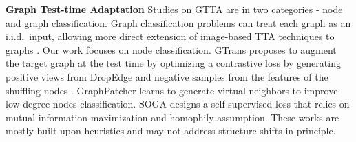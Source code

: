 \textbf{Graph Test-time Adaptation} Studies on GTTA are in two categories - node and graph classification.
Graph classification problems can treat each graph as an i.i.d.\ input, allowing more direct extension of image-based TTA techniques to graphs \cite{chen2022graphtta, wang2022test}.
Our work focuses on node classification. %
GTrans \cite{jin2022empowering} proposes to augment the target graph at the test time by optimizing a contrastive loss by generating positive views from DropEdge \cite{rong2019dropedge} and negative samples from the features of the shuffling nodes \cite{velivckovic2018deep}. 
GraphPatcher \cite{ju2024graphpatcher} learns to generate virtual neighbors to improve low-degree nodes classification. 
SOGA \cite{mao2024source} designs a self-supervised loss that relies on  mutual information maximization and homophily assumption.
These works are mostly built upon heuristics and may not address  structure shifts in principle.

